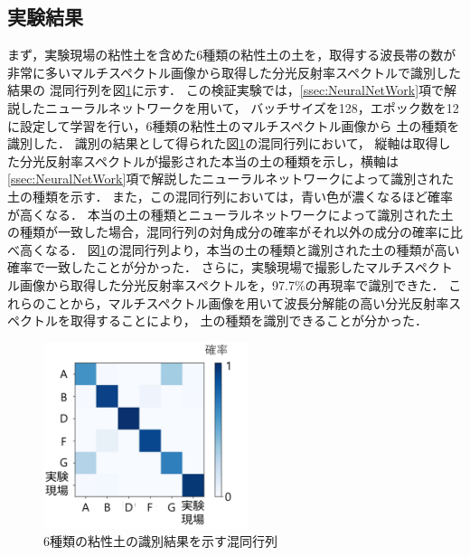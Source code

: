 \subsection{実験結果}
\label{ssec:ConeindexEstimationExperimentResult}

まず，実験現場の粘性土を含めた6種類の粘性土の土を，取得する波長帯の数が非常に多いマルチスペクトル画像から取得した分光反射率スペクトルで識別した結果の
混同行列を図\ref{fig:coneindex_estimation_confusion_matrix}に示す．
この検証実験では，\ref{ssec:NeuralNetWork}項で解説したニューラルネットワークを用いて，
バッチサイズを128，エポック数を12に設定して学習を行い，6種類の粘性土のマルチスペクトル画像から
土の種類を識別した．
識別の結果として得られた図\ref{fig:coneindex_estimation_confusion_matrix}の混同行列において，
縦軸は取得した分光反射率スペクトルが撮影された本当の土の種類を示し，横軸は\ref{ssec:NeuralNetWork}項で解説したニューラルネットワークによって識別された土の種類を示す．
また，この混同行列においては，青い色が濃くなるほど確率が高くなる．
本当の土の種類とニューラルネットワークによって識別された土の種類が一致した場合，混同行列の対角成分の確率がそれ以外の成分の確率に比べ高くなる．
図\ref{fig:coneindex_estimation_confusion_matrix}の混同行列より，本当の土の種類と識別された土の種類が高い確率で一致したことが分かった．
さらに，実験現場で撮影したマルチスペクトル画像から取得した分光反射率スペクトルを，97.7\%の再現率で識別できた．
これらのことから，マルチスペクトル画像を用いて波長分解能の高い分光反射率スペクトルを取得することにより，
土の種類を識別できることが分かった．

\begin{figure}[b]
      \begin{center}
            \includegraphics[width=6cm]{./ch5_ConeIndexEstimation/Fig/coneindex_estimation_confusion_matrix_compressed.pdf}
            \caption{6種類の粘性土の識別結果を示す混同行列}
            \label{fig:coneindex_estimation_confusion_matrix}
      \end{center}
\end{figure}

